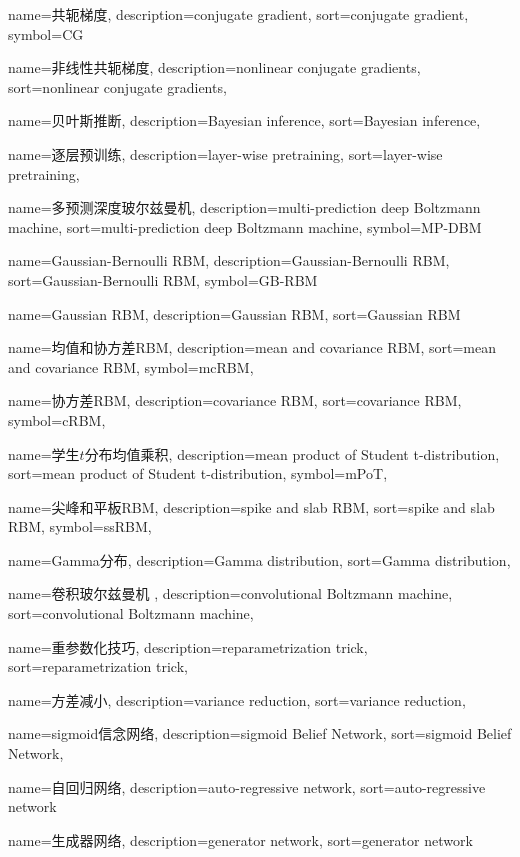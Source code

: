 {
  name=共轭梯度,
  description={conjugate gradient},
  sort={conjugate gradient},
  symbol={CG}
}

{
  name=非线性共轭梯度,
  description={nonlinear conjugate gradients},
  sort={nonlinear conjugate gradients},
}

{
  name=贝叶斯推断,
  description={Bayesian inference},
  sort={Bayesian inference},
}

{
  name=逐层预训练,
  description={layer-wise pretraining},
  sort={layer-wise pretraining},
}

{
  name=多预测深度玻尔兹曼机,
  description={multi-prediction deep Boltzmann machine},
  sort={multi-prediction deep Boltzmann machine},
  symbol={MP-DBM}
}

{
  name=Gaussian-Bernoulli RBM,
  description={Gaussian-Bernoulli RBM},
  sort={Gaussian-Bernoulli RBM},
  symbol={GB-RBM}
}

{
  name=Gaussian RBM,
  description={Gaussian RBM},
  sort={Gaussian RBM}
}

{
  name=均值和协方差RBM,
  description={mean and covariance RBM},
  sort={mean and covariance RBM},
  symbol={mcRBM},
}

{
  name=协方差RBM,
  description={covariance RBM},
  sort={covariance RBM},
  symbol={cRBM},
}


{
  name=学生$t$分布均值乘积,
  description={mean product of Student t-distribution},
  sort={mean product of Student t-distribution},
  symbol={mPoT},
}

{
  name=尖峰和平板RBM,
  description={spike and slab RBM},
  sort={spike and slab RBM},
  symbol={ssRBM},
}

{
  name=Gamma分布,
  description={Gamma distribution},
  sort={Gamma distribution},
}

{
  name=卷积玻尔兹曼机 ,
  description={convolutional Boltzmann machine},
  sort={convolutional Boltzmann machine},
}

{
  name=重参数化技巧,
  description={reparametrization trick},
  sort={reparametrization trick},
}

{
  name=方差减小,
  description={variance reduction},
  sort={variance reduction},
}

{
  name=sigmoid信念网络,
  description={sigmoid Belief Network},
  sort={sigmoid Belief Network},
}

{
  name=自回归网络,
  description={auto-regressive network},
  sort={auto-regressive network}
}

{
  name=生成器网络,
  description={generator network},
  sort={generator network}
}
